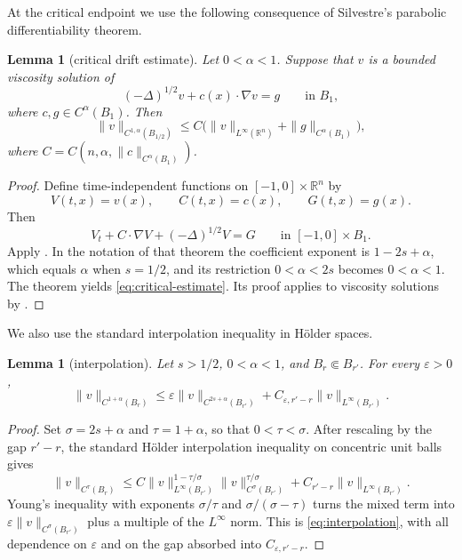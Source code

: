 \documentclass[10pt,a4paper]{amsart}
\numberwithin{equation}{section}
\newtheorem{lemma}[theorem]{Lemma}
\newcommand{\R}{\mathbb R}
\begin{document}
At the critical endpoint we use the following consequence of Silvestre's
parabolic differentiability theorem.

\begin{lemma}[critical drift estimate]\label{lem:critical}
Let $0<\alpha<1$.  Suppose that $v$ is a bounded viscosity solution of
\begin{equation}\label{eq:critical-equation}
 (-\Delta)^{1/2}v+c(x)\cdot\nabla v=g
 \qquad\text{in }B_1,
\end{equation}
where $c,g\in C^\alpha(B_1)$.  Then
\begin{equation}\label{eq:critical-estimate}
 \|v\|_{C^{1,\alpha}(B_{1/2})}
 \le C\bigl(\|v\|_{L^\infty(\R^n)}
             +\|g\|_{C^\alpha(B_1)}\bigr),
\end{equation}
where $C=C(n,\alpha,\|c\|_{C^\alpha(B_1)})$.
\end{lemma}

\begin{proof}
Define time-independent functions on $[-1,0]\times\R^n$ by
\[
 V(t,x)=v(x),\qquad C(t,x)=c(x),\qquad G(t,x)=g(x).
\]
Then
\[
 V_t+C\cdot\nabla V+(-\Delta)^{1/2}V=G
 \qquad\text{in }[-1,0]\times B_1.
\]
Apply \cite[Theorem~1.1]{Silvestre2012Diff}.  In the notation of that
theorem the coefficient exponent is $1-2s+\alpha$, which equals $\alpha$
when $s=1/2$, and its restriction $0<\alpha<2s$ becomes $0<\alpha<1$.
The theorem yields \eqref{eq:critical-estimate}.  Its proof applies to
viscosity solutions by \cite[Section~3]{Silvestre2012Diff}.
\end{proof}

We also use the standard interpolation inequality in H\"older spaces.

\begin{lemma}[interpolation]\label{lem:interpolation}
Let $s>1/2$, $0<\alpha<1$, and
$B_r\Subset B_{r'}$.  For every $\varepsilon>0$,
\begin{equation}\label{eq:interpolation}
 \|v\|_{C^{1+\alpha}(B_r)}
 \le \varepsilon\|v\|_{C^{2s+\alpha}(B_{r'})}
 +C_{\varepsilon,r'-r}\|v\|_{L^\infty(B_{r'})}.
\end{equation}
\end{lemma}

\begin{proof}
\begingroup
Set $\sigma=2s+\alpha$ and $\tau=1+\alpha$, so that
$0<\tau<\sigma$.  After rescaling by the gap $r'-r$, the standard H\"older
interpolation inequality on concentric unit balls gives
\[
 \|v\|_{C^\tau(B_r)}
 \le C\|v\|_{L^\infty(B_{r'})}^{1-\tau/\sigma}
       \|v\|_{C^\sigma(B_{r'})}^{\tau/\sigma}
 +C_{r'-r}\|v\|_{L^\infty(B_{r'})}.
\]
Young's inequality with exponents $\sigma/\tau$ and
$\sigma/(\sigma-\tau)$ turns the mixed term into
$\varepsilon\|v\|_{C^\sigma(B_{r'})}$ plus a multiple of the
$L^\infty$ norm.  This is \eqref{eq:interpolation}, with all dependence on
$\varepsilon$ and on the gap absorbed into $C_{\varepsilon,r'-r}$.
\endgroup
\end{proof}
\end{document}
